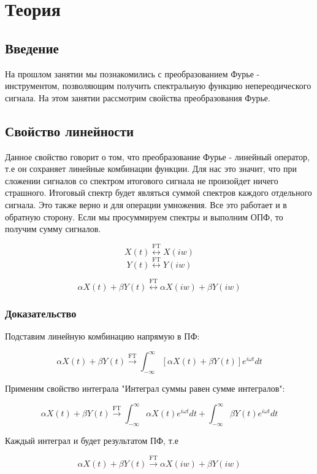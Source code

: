\chapter{Теория}
\label{ch:intro}

\section*{\textbf{Введение}}

На прошлом занятии мы познакомились с преобразованием Фурье - инструментом, позволяющим получить спектральную функцию непереодического сигнала.
На этом занятии рассмотрим свойства преобразования Фурье.

\section*{\textbf{Свойство линейности}}

Данное свойство говорит о том, что преобразование Фурье - линейный оператор, т.е он сохраняет линейные комбинации функции. Для нас
это значит, что при сложении сигналов со спектром итогового сигнала не произойдет ничего страшного. Итоговый спектр будет
являться суммой спектров каждого отдельного сигнала. Это также верно и для операции умножения. Все это работает и в обратную сторону. Если мы просуммируем спектры
и выполним ОПФ, то получим сумму сигналов.

$$X(t)\overset{\text{FT}}{\leftrightarrow}X(iw)$$
$$Y(t)\overset{\text{FT}}{\leftrightarrow}Y(iw)$$

$$\alpha X(t) + \beta Y(t)\overset{\text{FT}}{\leftrightarrow}\alpha X(iw) + \beta Y(iw)$$

\subsection*{\textbf{Доказательство}}

Подставим линейную комбинацию напрямую в ПФ:

$$\alpha X(t) + \beta Y(t)\overset{\text{FT}}{\to} \int_{-\infty}^{\infty}[\alpha X(t) + \beta Y(t)]e^{i\omega t}dt$$

Применим свойство интеграла "Интеграл суммы равен сумме интегралов":

$$\alpha X(t) + \beta Y(t)\overset{\text{FT}}{\to} \int_{-\infty}^{\infty}\alpha X(t)e^{i\omega t}dt + \int_{-\infty}^{\infty}\beta Y(t)e^{i\omega t}dt$$

Каждый интеграл и будет результатом ПФ, т.е

$$\alpha X(t) + \beta Y(t)\overset{\text{FT}}{\to} \alpha X(iw) + \beta Y(iw)$$

